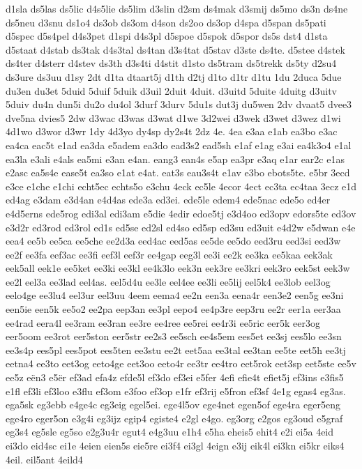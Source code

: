 {d1sla
ds5las
ds5lic
d4s5lie
ds5lim
d3slin
d2sm
ds4mak
d3smij
ds5mo
ds3n
ds4ne
ds5neu
d3snu
ds1o4
ds3ob
ds3om
d4son
ds2oo
ds3op
d4spa
d5span
ds5pati
d5spec
d5s4pel
d4s3pet
d1spi
d4s3pl
d5spoe
d5spok
d5spor
ds5s
dst4
d1sta
d5staat
d4stab
ds3tak
d4s3tal
ds4tan
d3s4tat
d5stav
d3ste
ds4te.
d5stee
d4stek
ds4ter
d4sterr
d4stev
ds3th
d3s4ti
d4stit
d1sto
ds5tram
ds5trekk
ds5ty
d2su4
ds3ure
ds3uu
d1sy
2dt
d1ta
dtaart5j
d1th
d2tj
d1to
d1tr
d1tu
1du
2duca
5due
du3en
du3et
5duid
5duif
5duik
d3uil
2duit
4duit.
d3uitd
5duite
4duitg
d3uitv
5duiv
du4n
dun5i
du2o
du4ol
3durf
3durv
5du1s
dut3j
du5wen
2dv
dvaat5
dvee3
dve5na
dvies5
2dw
d3wac
d3was
d3wat
d1we
3d2wei
d3wek
d3wet
d3wez
d1wi
4d1wo
d3wor
d3wr
1dy
4d3yo
dy4sp
dy2s4t
2dz
4e.
4ea
e3aa
e1ab
ea3bo
e3ac
ea4ca
eac5t
e1ad
ea3da
e5adem
ea3do
ead3s2
ead5sh
e1af
e1ag
e3ai
ea4k3o4
e1al
ea3la
e3ali
e4als
ea5mi
e3an
e4an.
eang3
ean4s
e5ap
ea3pr
e3aq
e1ar
ear2c
e1as
e2asc
ea5s4e
ease5t
ea3so
e1at
e4at.
eat3s
eau3s4t
e1av
e3bo
ebots5te.
e5br
3ecd
e3ce
e1che
e1chi
echt5ec
echts5o
e3chu
4eck
ec5le
4ecor
4ect
ec3ta
ec4taa
3ecz
e1d
ed4ag
e3dam
e3d4an
e4d4as
ede3a
ed3ei.
ede5le
edem4
ede5nac
ede5o
ed4er
e4d5erns
ede5rog
edi3al
edi3am
e5die
4edir
edoe5tj
e3d4oo
ed3opv
edors5te
ed3ov
e3d2r
ed3rod
ed3rol
ed1s
ed5se
ed2sl
ed4so
ed5sp
ed3su
ed3uit
e4d2w
e5dwan
e4e
eea4
ee5b
ee5ca
ee5che
ee2d3a
eed4ac
eed5as
ee5de
ee5do
eed3ru
eed3si
eed3w
ee2f
ee3fa
eef3ac
ee3fi
eef3l
eef3r
ee4gap
eeg3l
ee3i
ee2k
ee3ka
ee5kaa
eek3ak
eek5all
eek1e
ee5ket
ee3ki
ee3kl
ee4k3lo
eek3n
eek3re
ee3kri
eek3ro
eek5st
eek3w
ee2l
eel3a
ee3lad
eel4as.
eel5d4u
ee3le
eel4ee
ee3li
ee5lij
eel5k4
ee3lob
eel3og
eelo4ge
ee3lu4
eel3ur
eel3uu
4eem
eema4
ee2n
een3a
eena4r
een3e2
een5g
ee3ni
een5ie
een5k
ee5o2
ee2pa
eep3an
ee3pl
eepo4
ee4p3re
eep3ru
ee2r
eer1a
eer3aa
ee4rad
eera4l
ee3ram
ee3ran
ee3re
ee4ree
ee5rei
ee4r3i
ee5ric
eer5k
eer3og
eer5oom
ee3rot
eer5ston
eer5str
ee2s3
ee5sch
ee4s5em
ees5et
ee3sj
ees5lo
ee3sn
ee3s4p
ees5pl
ees5pot
ees5ten
ee3stu
ee2t
eet5aa
ee3tal
ee3tan
ee5te
eet5h
ee3tj
eetna4
ee3to
eet3og
eeto4ge
eet3oo
eeto4r
ee3tr
ee4tro
eet5rok
eet3sp
eet5ste
ee5v
ee5z
eën3
e5ër
ef3ad
efa4z
efde5l
ef3do
ef3ei
e5fer
4efi
efie4t
efiet5j
ef3ins
e3fis5
e1fl
ef3li
ef3loo
e3flu
ef3om
e3foo
ef3op
e1fr
ef3rij
e5fron
ef3sf
4e1g
egas4
eg3as.
ega5sk
eg3ebb
e4ge4c
eg3eig
egel5ei.
ege4l5ov
ege4net
egen5of
ege4ra
eger5eng
ege4ro
eger5on
e3g4i
eg3ijz
egip4
egiste4
e2gl
e4go.
eg3org
e2gos
eg3oud
e5graf
eg3s4
eg5sle
eg5so
e2g3u4r
egut4
e4g3uu
e1h4
e5ha
eheis5
ehit4
e2i
ei5a
4eid
ei3do
eid4sc
ei1e
4eien
eien5s
eie5re
ei3f4
ei3gl
4eign
e3ij
eik4l
ei3kn
ei5kr
eiks4
4eil.
eil5ant
4eild4
}
